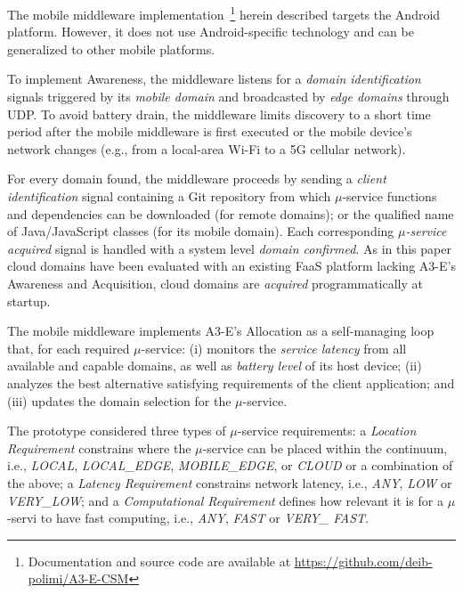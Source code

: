 
The mobile middleware implementation~\footnote{Documentation and source code are available at \url{https://github.com/deib-polimi/A3-E-CSM}} herein described targets the Android platform. However, it does not use Android-specific technology and can be generalized to other mobile platforms.

To implement Awareness, the middleware listens for a \textit{domain identification} signals triggered by its \textit{mobile domain} and broadcasted by \textit{edge domains} through UDP. To avoid battery drain, the middleware limits discovery to 
a short time period after the mobile middleware is first executed or the mobile device's network changes (e.g., from a local-area Wi-Fi to a 5G cellular network). 

For every domain found, the middleware proceeds by sending a \textit{client identification} signal containing a Git repository from which $\mu$-service functions and dependencies can be downloaded (for remote domains); or the qualified name of Java/JavaScript classes (for its mobile domain). Each corresponding \textit{$\mu$-service acquired} signal is handled with a system level \textit{domain confirmed}. As in this paper cloud domains have been evaluated with an existing FaaS platform lacking A3-E's Awareness and Acquisition, cloud domains are \textit{acquired} programmatically at startup.



The mobile middleware implements A3-E's Allocation as a self-managing loop that, for each required $\mu$-service: (i) monitors the \textit{service latency} from all available and capable domains, as well as \textit{battery level} of its host device; (ii) analyzes the best alternative satisfying requirements of the client application; and (iii) updates the domain selection for the $\mu$-service. 

The prototype considered three types of $\mu$-service requirements: a \textit{Location Requirement} constrains where the $\mu$-service can be placed within the continuum, i.e., \textit{LOCAL}, \textit{LOCAL\_EDGE}, \textit{MOBILE\_EDGE}, or \textit{CLOUD} or a combination of the above;  a \textit{Latency Requirement} constrains network latency, i.e., \textit{ANY}, \textit{LOW} or \textit{VERY\_LOW}; and a \textit{Computational Requirement} defines how relevant it is for a $\mu$-servi to have fast computing, i.e., \textit{ANY}, \textit{FAST} or \textit{VERY\_ FAST}. 

